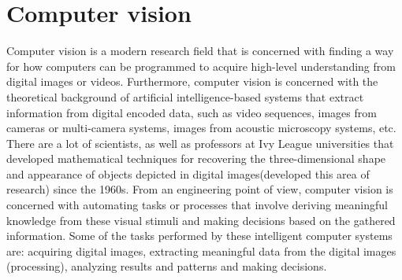 \documentclass[12pt,a4paper,twoside]{report}
\begin{document}
\section{Computer vision}
Computer vision is a modern research field that is concerned with finding a way for how computers can be programmed to acquire high-level understanding from digital images or videos. Furthermore, computer vision is concerned with the theoretical background of artificial intelligence-based systems that extract information from digital encoded data, such as video sequences, images from cameras or multi-camera systems, images from acoustic microscopy systems, etc. There are a lot of scientists, as well as professors at Ivy League universities that developed mathematical techniques for recovering the three-dimensional shape and appearance of objects depicted in digital images(developed this area of research) since the 1960s. From an engineering point of view, computer vision is concerned with automating tasks or processes that involve deriving meaningful knowledge from these visual stimuli and making decisions based on the gathered information. Some of the tasks performed by these intelligent computer systems are: acquiring digital images, extracting meaningful data from the digital images (processing), analyzing results and patterns and making decisions\cite{article-computervision}\cite{article-cvapp}. 
\end{document}
